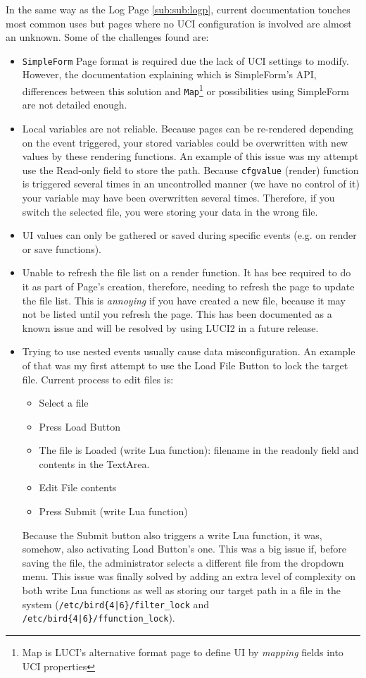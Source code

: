 In the same way as the Log Page \ref{sub:sub:logp}, current documentation touches most common uses but pages where no UCI configuration is involved are almost an unknown. Some of the challenges found are:
\begin{itemize}
    \item \texttt{SimpleForm} Page format is required due the lack of UCI settings to modify. However, the documentation explaining which is SimpleForm's API, differences between this solution and \texttt{Map}\footnote{Map is LUCI's alternative format page to define UI by \textit{mapping} fields into UCI properties} or possibilities using SimpleForm are not detailed enough.
    \item Local variables are not reliable. Because pages can be re-rendered depending on the event triggered, your stored variables could be overwritten with new values by these rendering functions.
    An example of this issue was my attempt use the Read-only field to store the path. Because \texttt{cfgvalue} (render) function is triggered several times in an uncontrolled manner (we have no control of it) your variable may have been overwritten several times. Therefore, if you switch the selected file, you were storing your data in the wrong file.
    \item UI values can only be gathered or saved during specific events (e.g. on render or save functions).
    \item Unable to refresh the file list on a render function. It has bee required to do it as part of Page's creation, therefore, needing to refresh the page to update the file list. This is \textit{annoying} if you have created a new file, because it may not be listed until you refresh the page.
    This has been documented as a known issue and will be resolved by using LUCI2 in a future release. 
    \item Trying to use nested events usually cause data misconfiguration.
    An example of that was my first attempt to use the Load File Button to lock the target file. Current process to edit files is: 
    \begin{itemize}
        \item Select a file
        \item Press Load Button
        \item The file is Loaded (write Lua function): filename in the readonly field and contents in the TextArea.
        \item Edit File contents
        \item Press Submit (write Lua function)
    \end{itemize}
    Because the Submit button also triggers a write Lua function, it was, somehow, also activating Load Button's one. This was a big issue if, before saving the file, the administrator selects a different file from the dropdown menu.
    This issue was finally solved by adding an extra level of complexity on both write Lua functions as well as storing our target path in a file in the system (\texttt{/etc/bird\{4|6\}/filter\_lock} and \texttt{/etc/bird\{4|6\}/ffunction\_lock}).
\end{itemize}




